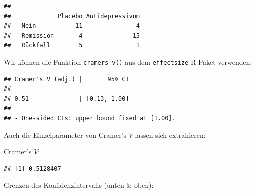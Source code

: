 \documentclass[
]{book}
\newenvironment{Shaded}{\begin{snugshade}}{\end{snugshade}}
\newcommand{\FunctionTok}[1]{\textcolor[rgb]{0.00,0.00,0.00}{#1}}
\newcommand{\NormalTok}[1]{#1}
\newcommand{\SpecialCharTok}[1]{\textcolor[rgb]{0.00,0.00,0.00}{#1}}
\begin{document}
\begin{Shaded}
\end{Shaded}

\begin{verbatim}
##            
##             Placebo Antidepressivum
##   Nein           11               4
##   Remission       4              15
##   Rückfall        5               1
\end{verbatim}

Wir können die Funktion \texttt{cramers\_v()} aus dem \texttt{effectsize} R-Paket verwenden:

\begin{Shaded}
\end{Shaded}

\begin{verbatim}
## Cramer's V (adj.) |       95% CI
## --------------------------------
## 0.51              | [0.13, 1.00]
## 
## - One-sided CIs: upper bound fixed at [1.00].
\end{verbatim}

Auch die Einzelparameter von Cramer's \(V\) lassen sich extrahieren:

Cramer's \(V\):

\begin{Shaded}
\end{Shaded}

\begin{verbatim}
## [1] 0.5128407
\end{verbatim}

Grenzen des Konfidenzintervalls (unten \& oben):
\end{document}
